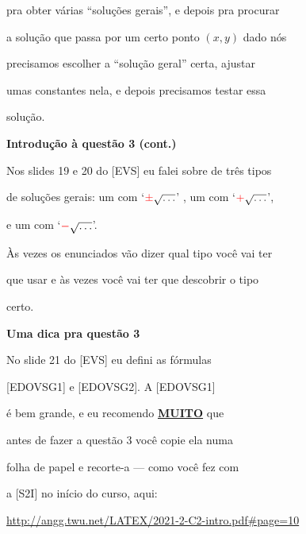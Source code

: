 \documentclass[oneside,12pt]{article}
\begin{document}
pra obter várias ``soluções gerais'', e depois pra procurar

a solução que passa por um certo ponto $(x,y)$ dado nós

precisamos escolher a ``solução geral'' certa, ajustar

umas constantes nela, e depois precisamos testar essa

solução.




\newpage



\msk

{\bf Introdução à questão 3 (cont.)}

\ssk

\def\ssqrt#1{\ColorRed{#1}\sqrt{\mathstrut\ldots}}

Nos slides 19 e 20 do [EVS] eu falei sobre  de três tipos

de soluções gerais: um com `$\ColorRed{\pm}\sqrt{\ldots}$' , um com
`$\ColorRed{+}\sqrt{\ldots}$',

e um com `$\ColorRed{-}\sqrt{\ldots}$'.

\msk

Às vezes os enunciados vão dizer qual tipo você vai ter

que usar e às vezes você vai ter que descobrir o tipo

certo.


\newpage


{\bf Uma dica pra questão 3}

\ssk

No slide 21 do [EVS] eu defini as fórmulas

[EDOVSG1] e [EDOVSG2]. A [EDOVSG1]

é bem grande, e eu recomendo \underline{{\bf MUITO}} que

antes de fazer a questão 3 você copie ela numa

folha de papel e recorte-a --- como você fez com

a [S2I] no início do curso, aqui:

\ssk

{\footnotesize

\url{http://angg.twu.net/LATEX/2021-2-C2-intro.pdf#page=10}

}
\end{document}
